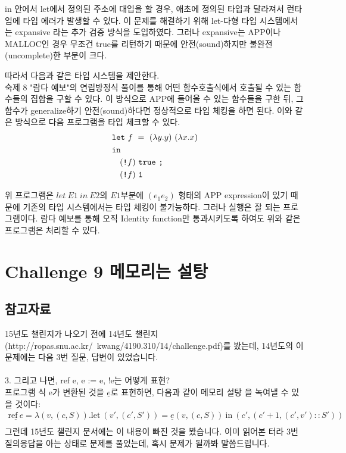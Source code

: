 \documentclass[a4paper]{article}
\begin{document}
in 안에서 let에서 정의된 주소에 대입을 할 경우, 애초에 정의된 타입과 달라져서 런타임에 타입 에러가 발생할 수 있다. 이 문제를 해결하기 위해 let-다형 타입 시스템에서는 expansive 라는 추가 검증 방식을 도입하였다. 그러나 expansive는 APP이나 MALLOC인 경우 무조건 true를 리턴하기 때문에 안전(sound)하지만 불완전(uncomplete)한 부분이 크다.

따라서 다음과 같은 타입 시스템을 제안한다. \\
숙제 8 "람다 예보"의 연립방정식 풀이를 통해 어떤 함수호출식에서 호출될 수 있는 함수들의 집합을 구할 수 있다. 이 방식으로 APP에 들어올 수 있는 함수들을 구한 뒤, 그 함수가 generalize하기 안전(sound)하다면 정상적으로 타입 체킹을 하면 된다.
이와 같은 방식으로 다음 프로그램을 타입 체크할 수 있다.
\begin{align*}
&\texttt{let}\ f\ =\ (\lambda y.y)\ (\lambda x. x)\\
&\texttt{in} \\
&\hphantom{in} (\texttt{!}f)\ \texttt{true}\ \texttt{;}\\
&\hphantom{in} (\texttt{!}f)\ \texttt{1}
\end{align*}

위 프로그램은 $let\ E1\ in\ E2$의 $E1$부분에 $(e_1 e_2)$ 형태의 APP expression이 있기 때문에 기존의 타입 시스템에서는 타입 체킹이 불가능하다. 그러나 실행은 잘 되는 프로그램이다. 람다 예보를 통해 오직 Identity function만 통과시키도록 하여도 위와 같은 프로그램은 처리할 수 있다.


\section*{Challenge 9 메모리는 설탕}
\subsection*{참고자료}
15년도 챌린지가 나오기 전에 14년도 챌린지 (http://ropas.snu.ac.kr/~kwang/4190.310/14/challenge.pdf)를 봤는데, 14년도의 이 문제에는 다음 3번 질문, 답변이 있었습니다.\\
\\
3. 그리고 나면, ref e, e := e, !e는 어떻게 표현?\\
프로그램 식 e가 변환된 것을 $\underline{e}$로 표현하면, 다음과 같이 메모리 설탕
을 녹여낼 수 있을 것이다:\\
\begin{align*}
\underline{\textrm{ref}\ e} = \lambda(v, (c,S)).\textrm{let}\ (v',(c',S'))=\underline{e}(v,(c,S))\ \textrm{in}\ (c',(c'+1, (c',v')::S')) \\
\end{align*}
그런데 15년도 챌린지 문서에는 이 내용이 빠진 것을 봤습니다. 이미 읽어본 터라 3번 질의응답을 아는 상태로 문제를 풀었는데, 혹시 문제가 될까봐 말씀드립니다.
\end{document}
